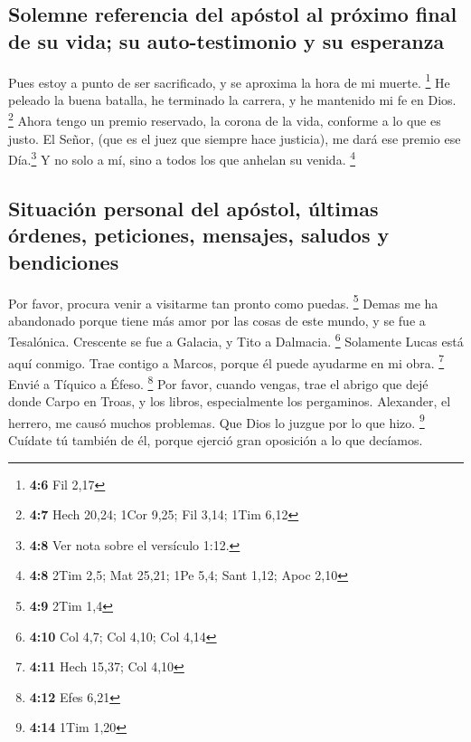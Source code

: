 \hypertarget{solemne-referencia-del-apuxf3stol-al-pruxf3ximo-final-de-su-vida-su-auto-testimonio-y-su-esperanza}{%
\subsection{Solemne referencia del apóstol al próximo final de su vida;
su auto-testimonio y su
esperanza}\label{solemne-referencia-del-apuxf3stol-al-pruxf3ximo-final-de-su-vida-su-auto-testimonio-y-su-esperanza}}

 Pues estoy a punto de ser sacrificado, y se aproxima la
hora de mi muerte. \footnote{\textbf{4:6} Fil 2,17}  He
peleado la buena batalla, he terminado la carrera, y he mantenido mi fe
en Dios. \footnote{\textbf{4:7} Hech 20,24; 1Cor 9,25; Fil 3,14; 1Tim
  6,12}  Ahora tengo un premio reservado, la corona de la
vida, conforme a lo que es justo. El Señor, (que es el juez que siempre
hace justicia), me dará ese premio ese Día.\footnote{\textbf{4:8} Ver
  nota sobre el versículo 1:12.} Y no solo a mí, sino a todos los que
anhelan su venida. \footnote{\textbf{4:8} 2Tim 2,5; Mat 25,21; 1Pe 5,4;
  Sant 1,12; Apoc 2,10}

\hypertarget{situaciuxf3n-personal-del-apuxf3stol-uxfaltimas-uxf3rdenes-peticiones-mensajes-saludos-y-bendiciones}{%
\subsection{Situación personal del apóstol, últimas órdenes, peticiones,
mensajes, saludos y
bendiciones}\label{situaciuxf3n-personal-del-apuxf3stol-uxfaltimas-uxf3rdenes-peticiones-mensajes-saludos-y-bendiciones}}

 Por favor, procura venir a visitarme tan pronto como
puedas. \footnote{\textbf{4:9} 2Tim 1,4}  Demas me ha
abandonado porque tiene más amor por las cosas de este mundo, y se fue a
Tesalónica. Crescente se fue a Galacia, y Tito a Dalmacia. \footnote{\textbf{4:10}
  Col 4,7; Col 4,10; Col 4,14}  Solamente Lucas está aquí
conmigo. Trae contigo a Marcos, porque él puede ayudarme en mi obra.
\footnote{\textbf{4:11} Hech 15,37; Col 4,10}  Envié a
Tíquico a Éfeso. \footnote{\textbf{4:12} Efes 6,21}  Por
favor, cuando vengas, trae el abrigo que dejé donde Carpo en Troas, y
los libros, especialmente los pergaminos.  Alexander, el
herrero, me causó muchos problemas. Que Dios lo juzgue por lo que hizo.
\footnote{\textbf{4:14} 1Tim 1,20}  Cuídate tú también de
él, porque ejerció gran oposición a lo que decíamos.


